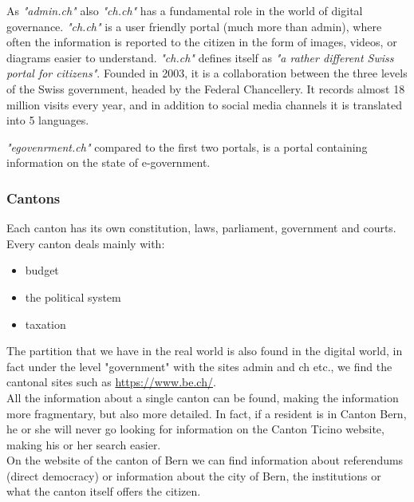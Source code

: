 As \textit{"admin.ch"} also \textit{"ch.ch"} has a fundamental role in the world of digital governance.
\textit{"ch.ch"} is a user friendly portal (much more than admin), where often the information is reported to the citizen in the form of images, videos, or diagrams easier to understand.
\textit{"ch.ch"} defines itself as \textit{"a rather different Swiss portal for citizens"}. Founded in 2003, it is a collaboration between the three levels of the Swiss government, headed by the Federal Chancellery. It records almost 18 million visits every year, and in addition to social media channels it is translated into 5 languages.

\textit{"egovenrment.ch"} compared to the first two portals, is a portal containing information on the state of e-government.

\subsubsection{Cantons}
Each canton has its own constitution, laws, parliament, government and courts. Every canton deals mainly with:
\begin{itemize}
\item budget
\item the political system
\item taxation
\end{itemize}

The partition that we have in the real world is also found in the digital world, in fact under the level "government" with the sites admin and ch etc., we find the cantonal sites such as \url{https://www.be.ch/}.\\

All the information about a single canton can be found, making the information more fragmentary, but also more detailed.
In fact, if a resident is in Canton Bern, he or she will never go looking for information on the Canton Ticino website, making his or her search easier.\\

On the website of the canton of Bern we can find information about referendums (direct democracy) or information about the city of Bern, the institutions or what the canton itself offers the citizen.

